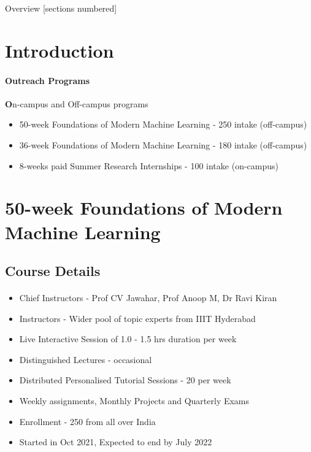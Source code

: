 \titleframe

\begin{frame}{Overview}
  [sections numbered]
  \tableofcontents[hideallsubsections]
\end{frame}


\section{Introduction}
\begin{frame}{\insertsectionhead}
  \framesubtitle{Outreach Programs}
  \textbf  On-campus and Off-campus programs
  \begin{itemize}
    \item 50-week Foundations of Modern Machine Learning - 250 intake (off-campus)
    \item 36-week Foundations of Modern Machine Learning - 180 intake (off-campus)
    \item 8-weeks paid Summer Research Internships - 100 intake (on-campus)
  \end{itemize}
\end{frame}


\section{50-week Foundations of Modern Machine Learning }

\subsection{Course Details}
\begin{frame}[fragile=singleslide]{\insertsectionhead}
  \framesubtitle{\insertsubsectionhead}
\begin{center}
\begin{itemize}
\item Chief Instructors - Prof CV Jawahar, Prof Anoop M, Dr Ravi Kiran 
\item Instructors - Wider pool of topic experts from IIIT Hyderabad
\item Live Interactive Session of 1.0 - 1.5 hrs duration per week
\item Distinguished Lectures - occasional
\item Distributed Personalised Tutorial Sessions - 20 per week
\item Weekly assignments, Monthly Projects and Quarterly Exams
\item Enrollment - 250 from all over India
\item Started in Oct 2021, Expected to end by July 2022
\end{itemize}
\end{center}
\end{frame}


